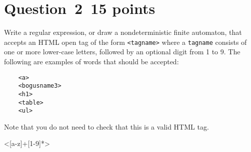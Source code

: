 \documentclass[10pt]{article}
\begin{document}
\section*{Question~2~\hfill 15 points}

Write a regular expression,
or draw a nondeterministic finite automaton,
that accepts an HTML open tag of the form
\verb|<tagname>|
where a \verb|tagname| consists
of one or more lower-case letters,
followed by an optional digit from 1 to 9.
The following are examples of words that should be accepted:
\begin{verbatim}
    <a>
    <bogusname3>
    <h1>
    <table>
    <ul>
\end{verbatim}
Note that you do not need to check that this is a valid HTML tag.

<[a-z]+[1-9]*>
\end{document}
